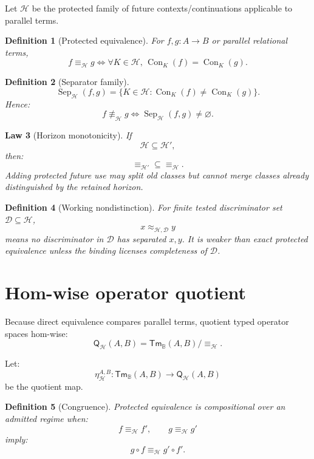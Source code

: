 \documentclass[11pt,oneside]{article}
\newtheorem{definition}{Definition}[section]
\newtheorem{law}[definition]{Law}
\newcommand{\B}{\mathbb B}
\newcommand{\Con}{\operatorname{Con}}
\newcommand{\Sep}{\operatorname{Sep}}
\begin{document}
Let \(\mathcal H\) be the protected family of future contexts/continuations applicable to parallel terms.

\begin{definition}[Protected equivalence]
For \(f,g:A\to B\) or parallel relational terms,
\[
\boxed{
f\equiv_{\mathcal H}g
\iff
\forall K\in\mathcal H,\,
\Con_K(f)=\Con_K(g).
}
\]
\end{definition}

\begin{definition}[Separator family]
\[
\boxed{
\Sep_{\mathcal H}(f,g)
=
\{
K\in\mathcal H:
\Con_K(f)\neq\Con_K(g)
\}.
}
\]
Hence:
\[
f\not\equiv_{\mathcal H}g
\iff
\Sep_{\mathcal H}(f,g)\neq\varnothing.
\]
\end{definition}

\begin{law}[Horizon monotonicity]
If
\[
\mathcal H\subseteq\mathcal H',
\]
then:
\[
\boxed{
\equiv_{\mathcal H'}
\subseteq
\equiv_{\mathcal H}.
}
\]
Adding protected future use may split old classes but cannot merge classes already distinguished by the retained horizon.
\end{law}

\begin{definition}[Working nondistinction]
For finite tested discriminator set \(\mathcal D\subseteq\mathcal H\),
\[
x\approx_{\mathcal H,\mathcal D}y
\]
means no discriminator in \(\mathcal D\) has separated \(x,y\).  It is weaker than exact protected equivalence unless the binding licenses completeness of \(\mathcal D\).
\end{definition}

\section{Hom-wise operator quotient}

Because direct equivalence compares parallel terms, quotient typed operator spaces hom-wise:
\[
\boxed{
\mathsf Q_{\mathcal H}(A,B)
=
\mathsf{Tm}_{\B}(A,B)/
{\equiv_{\mathcal H}}.
}
\]

Let:
\[
\eta_{\mathcal H}^{A,B}:
\mathsf{Tm}_{\B}(A,B)
\to
\mathsf Q_{\mathcal H}(A,B)
\]
be the quotient map.

\begin{definition}[Congruence]
Protected equivalence is compositional over an admitted regime when:
\[
f\equiv_{\mathcal H}f',
\qquad
g\equiv_{\mathcal H}g'
\]
imply:
\[
\boxed{
g\circ f
\equiv_{\mathcal H}
g'\circ f'.
}
\]
\end{definition}
\end{document}
